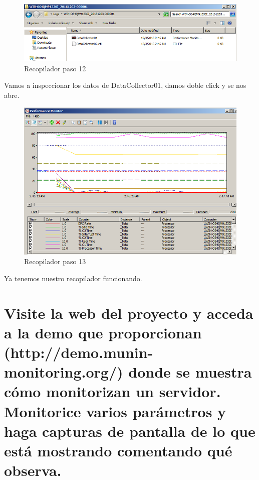 \begin{figure}[H] %
	\centering
	\includegraphics[scale=0.5]{pics/recopilador12.png}  %
	\caption{Recopilador paso 12} \label{fig:reco12}
\end{figure}

Vamos a inspeccionar los datos de DataCollector01, damos doble click y se nos abre.

\begin{figure}[H] %
	\centering
	\includegraphics[scale=0.5]{pics/recopilador13.png}  %
	\caption{Recopilador paso 13} \label{fig:reco13}
\end{figure}

Ya tenemos nuestro recopilador funcionando. \cite{crear}

\section[Cuestión 6]{Visite la web del proyecto y acceda a la demo que proporcionan (http://demo.munin-monitoring.org/) donde se muestra cómo	monitorizan un servidor. Monitorice varios parámetros y haga capturas de pantalla de lo que está mostrando comentando qué observa.}

